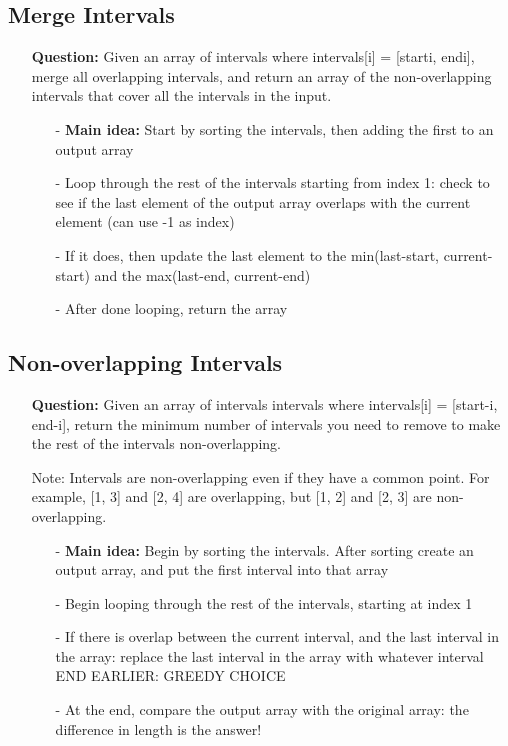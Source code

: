 \documentclass[12pt]{article}
\begin{document}
\subsection{Merge Intervals}
\begin{enumerate}
  \item[] \textbf{Question:} Given an array of intervals where intervals[i] = [starti, endi], merge all overlapping intervals, and return an array of the non-overlapping intervals that cover all the intervals in the input.

    \begin{enumerate}
      \item[-] \textbf{Main idea:} Start by sorting the intervals, then adding the first to an output array 
      \item[-] Loop through the rest of the intervals starting from index 1: check to see if the last element of the output array overlaps with the current element (can use -1 as index)
      \item[-] If it does, then update the last element to the min(last-start, current-start) and the max(last-end, current-end)
      \item[-] After done looping, return the array

    \end{enumerate}
\end{enumerate}


\subsection{Non-overlapping Intervals}
\begin{enumerate}
  \item[] \textbf{Question:} Given an array of intervals intervals where intervals[i] = [start-i, end-i], return the minimum number of intervals you need to remove to make the rest of the intervals non-overlapping.

Note: Intervals are non-overlapping even if they have a common point. For example, [1, 3] and [2, 4] are overlapping, but [1, 2] and [2, 3] are non-overlapping.

    \begin{enumerate}
      \item[-] \textbf{Main idea:} Begin by sorting the intervals. After sorting create an output array, and put the first interval into that array
      \item[-] Begin looping through the rest of the intervals, starting at index 1
      \item[-] If there is overlap between the current interval, and the last interval in the array: replace the last interval in the array with whatever interval END EARLIER: GREEDY CHOICE
      \item[-] At the end, compare the output array with the original array: the difference in length is the answer!

    \end{enumerate}
\end{enumerate}
\end{document}
